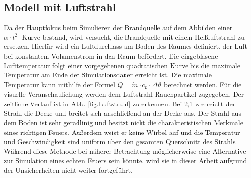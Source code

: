 \subsection{Modell mit Luftstrahl}
Da der Hauptfokus beim Simulieren der Brandquelle auf dem Abbilden einer $\alpha \cdot t^2$ -Kurve bestand, wird versucht, die Brandquelle mit einem Heißluftstrahl zu ersetzen. Hierfür wird ein Luftdurchlass am Boden des Raumes definiert, der Luft bei konstantem Volumenstrom in den Raum befördert. Die eingeblasene Lufttemperatur folgt einer vorgegebenen quadratischen Kurve bis die maximale Temperatur am Ende der Simulationsdauer erreicht ist. Die maximale Temperatur kann mithilfe der Formel $\Dot{Q}=\dot{m}\cdot c_p \cdot \Delta \vartheta$ berechnet werden. Für die visuelle Veranschaulichung werden dem Luftstrahl Rauchpartikel zugegeben. Der zeitliche Verlauf ist in Abb. \ref{fig:Luftstrahl} zu erkennen. Bei 2,1~s erreicht der Strahl die Decke und breitet sich anschließend an der Decke aus. 
Der Strahl aus dem Boden ist sehr geradlinig und besitzt nicht die charakteristischen Merkmale eines richtigen Feuers. Außerdem weist er keine Wirbel auf und die Temperatur und Geschwindigkeit sind uniform über den gesamten Querschnitt des Strahls. Während diese Methode bei näherer Betrachtung möglicherweise eine Alternative zur Simulation eines echten Feuers sein könnte, wird sie in dieser Arbeit aufgrund der Unsicherheiten nicht weiter fortgeführt.

